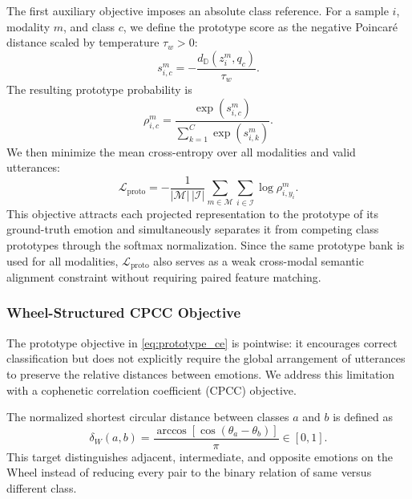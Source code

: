 \documentclass[letterpaper,journal]{IEEEtran}
\begin{document}
The first auxiliary objective imposes an absolute class reference. For a
sample \(i\), modality \(m\), and class \(c\), we define the prototype score as
the negative Poincar\'e distance scaled by temperature \(\tau_w>0\):
\begin{equation}
    s_{i,c}^{m}
    =-\frac{d_{\mathbb{D}}(z_i^{m},q_c)}{\tau_w}.
    \label{eq:prototype_score}
\end{equation}
The resulting prototype probability is
\begin{equation}
    \rho_{i,c}^{m}
    =\frac{\exp(s_{i,c}^{m})}
    {\sum_{k=1}^{C}\exp(s_{i,k}^{m})}.
    \label{eq:prototype_probability}
\end{equation}
We then minimize the mean cross-entropy over all modalities and valid
utterances:
\begin{equation}
    \mathcal{L}_{\mathrm{proto}}
    =-\frac{1}{|\mathcal{M}|\,|\mathcal{I}|}
    \sum_{m\in\mathcal{M}}
    \sum_{i\in\mathcal{I}}
    \log\rho_{i,y_i}^{m}.
    \label{eq:prototype_ce}
\end{equation}
This objective attracts each projected representation to the prototype of its
ground-truth emotion and simultaneously separates it from competing class
prototypes through the softmax normalization. Since the same prototype bank is
used for all modalities, \(\mathcal{L}_{\mathrm{proto}}\) also serves as a
weak cross-modal semantic alignment constraint without requiring paired
feature matching.

\subsubsection{Wheel-Structured CPCC Objective}

The prototype objective in \eqref{eq:prototype_ce} is pointwise: it encourages
correct classification but does not explicitly require the global arrangement
of utterances to preserve the relative distances between emotions. We address
this limitation with a cophenetic correlation coefficient (CPCC) objective.

The normalized shortest circular distance between classes \(a\) and \(b\) is
defined as
\begin{equation}
    \delta_{W}(a,b)
    =\frac{\arccos\!\left[
    \cos(\theta_a-\theta_b)\right]}{\pi}
    \in[0,1].
    \label{eq:wheel_class_distance}
\end{equation}
This target distinguishes adjacent, intermediate, and opposite emotions on the
Wheel instead of reducing every pair to the binary relation of same versus
different class.
\end{document}
